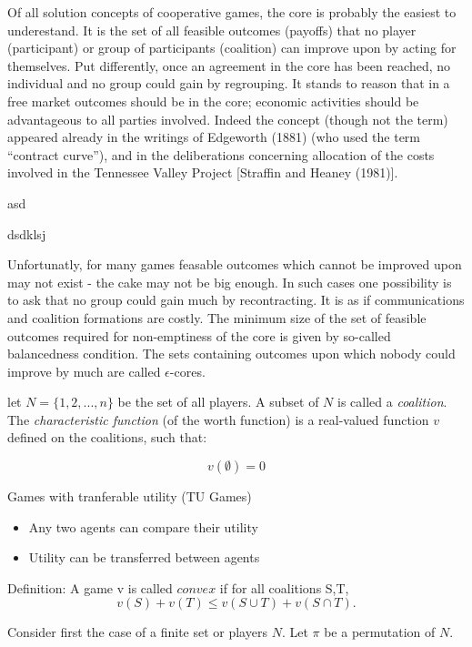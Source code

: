 \documentclass{article}
\begin{document}
Of all solution concepts of cooperative games, the core is probably the easiest to underestand. It is the set of all feasible outcomes (payoffs) that no player (participant) or group of participants (coalition) can improve upon by acting for themselves. Put differently, once an agreement in the core has been reached, no individual and no group could gain by regrouping. It stands to reason that in a free market outcomes should be in the core; economic activities should be advantageous to all parties involved. Indeed the concept (though not the term) appeared already in the writings of Edgeworth (1881) (who used the term ``contract curve''), and in the deliberations concerning allocation of the costs involved in the Tennessee Valley Project [Straffin and Heaney (1981)].

\cite{ahu61} asd

dsdklsj \cite{ab94}

Unfortunatly, for many games feasable outcomes which cannot be improved upon may not exist - the cake may not be big enough. In such cases one possibility is to ask that no group could gain much by recontracting. It is as if communications and coalition formations are costly. The minimum size of the set of feasible outcomes required for non-emptiness of the core is given by so-called balancedness condition. The sets containing outcomes upon which nobody could improve by much are called $\epsilon$-cores. 

let $N = \{1,2,...,n\}$ be the set of all players. A subset of $N$ is called a \emph{coalition}. The \textit{characteristic function} (of the worth function) is a real-valued function $v$ defined on the coalitions, such that:

\begin{equation}\label{eq:v0}
v(\emptyset) = 0
\end{equation}


Games with tranferable utility (TU Games)
\begin{itemize}
	\item Any two agents can compare their utility
	\item Utility can be transferred between agents
\end{itemize}

Definition: A game v is called $convex$ if for all coalitions S,T,
\begin{equation}\label{eq:con1}
v(S) + v(T) \leq v(S \cup T) + v(S \cap T).
\end{equation}

Consider first the case of a finite set or players $N$. Let $\pi$ be a permutation of $N$.
\end{document}
